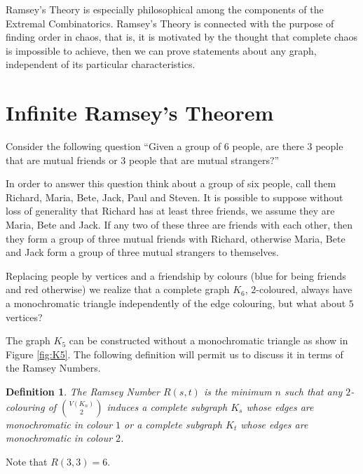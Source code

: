 \documentclass[12pt,twoside,a4paper,bibliography=totocnumbered]{book}
\numberwithin{equation}{section}
\newtheorem{definition}	[theorem] {Definition}
\theoremstyle{remark}
\begin{document}
Ramsey's Theory is especially philosophical among the components of the Extremal Combinatorics. Ramsey's Theory is connected with the purpose of finding order in chaos, that is, it is motivated by the thought that complete chaos is impossible to achieve, then we can prove statements about any graph, independent of its particular characteristics.

\section{Infinite Ramsey's Theorem}
Consider the following question ``Given a group of 6 people, are there 3 people that are mutual friends or 3 people that are mutual strangers?''

In order to answer this question think about a group of six people, call them Richard, Maria, Bete, Jack, Paul and Steven. It is possible to suppose without loss of generality that Richard has at least three friends, we assume they are Maria, Bete and Jack. If any two of these three are friends with each other, then they form a group of three mutual friends with Richard, otherwise Maria, Bete and Jack form a group of three mutual strangers to themselves. 

Replacing people by vertices and a friendship by colours (blue for being friends and red otherwise) we realize that a complete graph $K_6$, $2$-coloured, always have a monochromatic triangle independently of the edge colouring, but what about $5$ vertices?

The graph $K_5$ can be constructed without a monochromatic triangle as show in Figure \ref{fig:K5}. The following definition will permit us to discuss it in terms of the Ramsey Numbers.

\begin{definition}\label{def:RamseyNumbers} 
The \emph{Ramsey Number} $R(s,t)$ is the minimum $n$ such that any $2$-colouring of $\binom{V(K_n)}{2}$ induces a complete subgraph $K_s$ whose edges are monochromatic in colour $1$ or a complete subgraph $K_t$ whose edges are monochromatic in colour $2$.
\end{definition}

Note that $R(3,3) = 6$.
\end{document}

